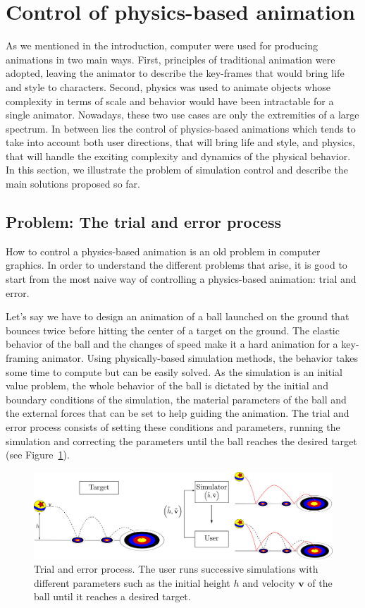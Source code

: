 \section{Control of physics-based animation}
\label{sec:starSimulationControl}

As we mentioned in the introduction, computer were used for producing animations in two main ways. 
First, principles of traditional animation were adopted, leaving the animator to describe the key-frames that would bring life and style to characters. 
Second, physics was used to animate objects whose complexity in terms of scale and behavior would have been intractable for a single animator. 
Nowadays, these two use cases are only the extremities of a large spectrum. 
In between lies the control of physics-based animations which tends to take into account both user directions, that will bring life and style, and physics, that will handle the exciting complexity and dynamics of the physical behavior.
In this section, we illustrate the problem of simulation control and describe the main solutions proposed so far.
\subsection{Problem: The trial and error process}
How to control a physics-based animation is an old problem in computer graphics. In order to understand the different problems that arise, it is good to start from the most naive way of controlling a physics-based animation: trial and error.

Let's say we have to design an animation of a ball launched on the ground that bounces twice before hitting the center of a target on the ground. 
The elastic behavior of the ball and the changes of speed make it a hard animation for a key-framing animator. 
Using physically-based simulation methods, the behavior takes some time to compute but can be easily solved.
As the simulation is an initial value problem, the whole behavior of the ball is dictated by the initial and boundary conditions of the simulation, the material parameters of the ball and the external forces that can be set to help guiding the animation. 
The trial and error process consists of setting these conditions and parameters, running the simulation and correcting the parameters until the ball reaches the desired target (see Figure~\ref{fig:trialErrorProcess}). 
\begin{figure}[!h]
	\centering
	\includegraphics[width=\linewidth]{./images/simulationControl/trialError.png}
	\caption[STAR control: Trial and error process]{\label{fig:trialErrorProcess}Trial and error process. 
	The user runs successive simulations with different parameters such as the initial height $h$ and velocity $\mathbf{v}$ of the ball until it reaches a desired target.}
\end{figure}

